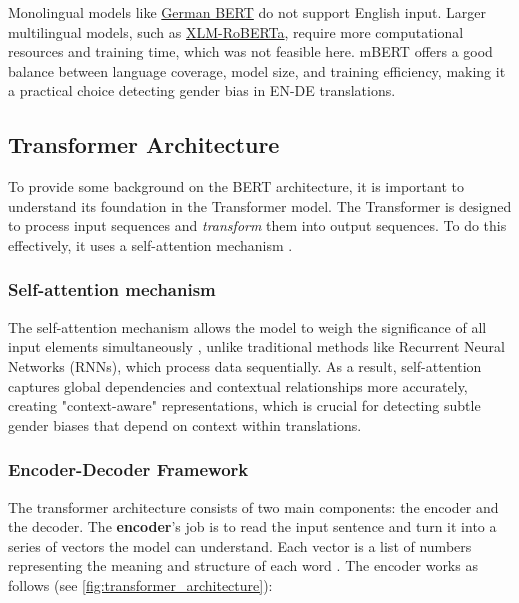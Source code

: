     Monolingual models like \href{https://huggingface.co/google-bert/bert-base-german-cased}{German BERT} do not support English input. Larger multilingual models, such as \href{https://huggingface.co/docs/transformers/en/model_doc/xlm-roberta}{XLM-RoBERTa}, require more computational resources and training time, which was not feasible here. mBERT offers a good balance between language coverage, model size, and training efficiency, making it a practical choice detecting gender bias in EN-DE translations.

\subsection{Transformer Architecture} \label{subsection:transformer_arch}
  To provide some background on the BERT architecture, it is important to understand its foundation in the Transformer model. The Transformer is designed to process input sequences and \textit{transform} them into output sequences. To do this effectively, it uses a self-attention mechanism \citep{phuongFormalAlgorithmsTransformers2022}.

    \subsubsection{Self-attention mechanism}
    The self-attention mechanism allows the model to weigh the significance of all input elements simultaneously \citep{xiaoIntroductionTransformersNLP2023}, unlike traditional methods like Recurrent Neural Networks (RNNs), which process data sequentially. As a result, self-attention captures global dependencies and contextual relationships more accurately, creating "context-aware" representations, which is crucial for detecting subtle gender biases that depend on context within translations.

    \subsubsection{Encoder-Decoder Framework} \label{subsection:encoder-decoder}
    The transformer architecture consists of two main components: the encoder and the decoder. The \textbf{encoder}’s job is to read the input sentence and turn it into a series of vectors the model can understand. Each vector is a list of numbers representing the meaning and structure of each word \citep{xiaoIntroductionTransformersNLP2023}. The encoder works as follows (see \autoref{fig:transformer_architecture}):

